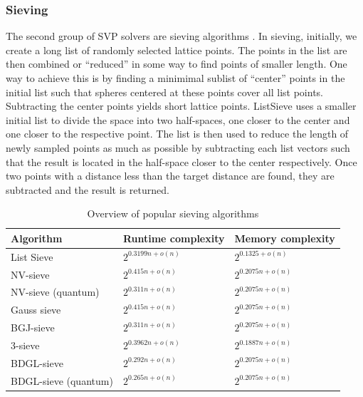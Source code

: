 \subsubsection{Sieving}
The second group of SVP solvers are sieving algorithms \cite{ADHKPS19, MV10, NV08, BGJ15, BLS16, HK17,BDGL16}. In sieving, initially, we create a long list of randomly selected lattice points. The points in the list are then combined or ``reduced'' in some way to find points of smaller length. One way to achieve this is by finding a minimimal sublist of ``center'' points in the initial list such that spheres centered at these points cover all list points. Subtracting the center points yields short lattice points. ListSieve \cite{MV10} uses a smaller initial list to divide the space into two half-spaces, one closer to the center and one closer to the respective point. The list is then used to reduce the length of newly sampled points as much as possible by subtracting each list vectors such that the result is located in the half-space closer to the center respectively. Once two points with a distance less than the target distance are found, they are subtracted and the result is returned.

\begin{table}[h]
  \centering
  \begin{tabular}{lll}
    \toprule
    Algorithm                                & Runtime complexity   & Memory complexity    \\\hline
    List Sieve \cite{MV10}                   & $2^{0.3199n + o(n)}$ & $2^{0.1325 + o(n)}$  \\
    NV-sieve \cite{NV08, ADHKPS19}           & $2^{0.415n + o(n)}$  & $2^{0.2075n + o(n)}$ \\
    NV-sieve (quantum) \cite{NV08, ADHKPS19} & $2^{0.311n + o(n)}$  & $2^{0.2075n + o(n)}$ \\
    Gauss sieve \cite{MV10, HK17}            & $2^{0.415n + o(n)}$  & $2^{0.2075n + o(n)}$ \\
    BGJ-sieve \cite{BGJ15}                   & $2^{0.311n + o(n)}$  & $2^{0.2075n + o(n)}$ \\
    3-sieve \cite{BLS16, HK17}               & $2^{0.3962n + o(n)}$ & $2^{0.1887n + o(n)}$ \\
    BDGL-sieve \cite{BDGL16}                 & $2^{0.292n + o(n)}$  & $2^{0.2075n + o(n)}$ \\
    BDGL-sieve (quantum) \cite{BDGL16}       & $2^{0.265n + o(n)}$  & $2^{0.2075n + o(n)}$ \\
    \bottomrule
  \end{tabular}
  \caption{Overview of popular sieving algorithms} %
  \label{tab:sieving}
\end{table}

